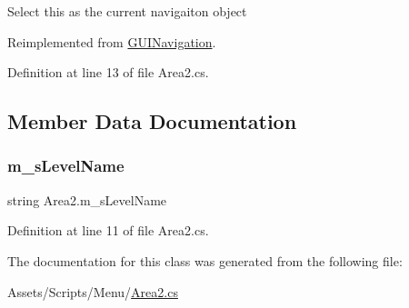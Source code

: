 Select this as the current navigaiton object 



Reimplemented from \mbox{\hyperlink{class_g_u_i_navigation_a4c40fc7986ac35247bc8f77c615e7847}{G\+U\+I\+Navigation}}.



Definition at line 13 of file Area2.\+cs.



\subsection{Member Data Documentation}
\mbox{\label{class_area2_a426af96b308118f6800b48c206d2e391}} 
\subsubsection{\texorpdfstring{m\+\_\+s\+Level\+Name}{m\_sLevelName}}
{\footnotesize\ttfamily string Area2.\+m\+\_\+s\+Level\+Name}



Definition at line 11 of file Area2.\+cs.



The documentation for this class was generated from the following file\+:\begin{DoxyCompactItemize}
\item 
Assets/\+Scripts/\+Menu/\mbox{\hyperlink{_area2_8cs}{Area2.\+cs}}\end{DoxyCompactItemize}
